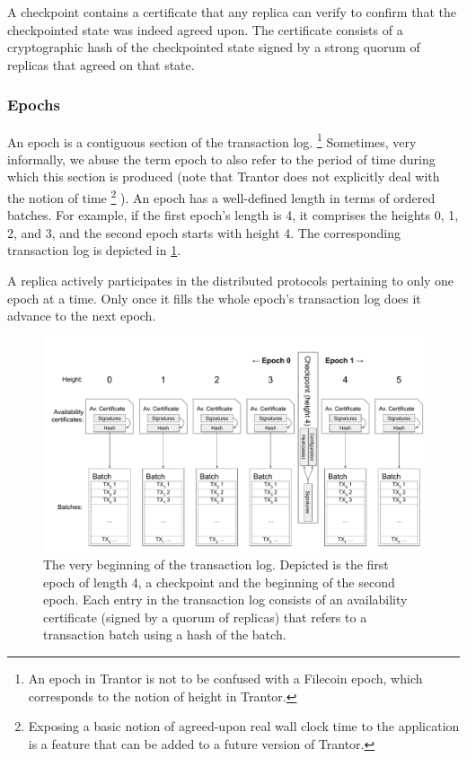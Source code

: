 \documentclass{article}
\begin{document}
A checkpoint contains a certificate that any replica can verify
to confirm that the checkpointed state was indeed agreed upon.
The certificate consists of a cryptographic hash of the checkpointed state
signed by a strong quorum of replicas that agreed on that state.

\subsubsection{Epochs}

An epoch is a contiguous section of the transaction log.%
\footnote{An epoch in Trantor is not to be confused with a Filecoin epoch,
which corresponds to the notion of height in Trantor.}
Sometimes, very informally, we abuse the term epoch to also refer to the period of time
during which this section is produced (note that Trantor does not explicitly deal with the notion of time%
\footnote{Exposing a basic notion of agreed-upon real wall clock time to the application
is a feature that can be added to a future version of Trantor.}
).
An epoch has a well-defined length in terms of ordered batches.
For example, if the first epoch’s length is 4, it comprises the heights 0, 1, 2, and 3,
and the second epoch starts with height 4.
The corresponding transaction log is depicted in \cref{fig:transaction-log}.

A replica actively participates in the distributed protocols pertaining to only one epoch at a time.
Only once it fills the whole epoch’s transaction log does it advance to the next epoch.

\begin{figure}[h]
    \centering
    \includegraphics[width=\textwidth]{figures/transaction-log}
    \caption{The very beginning of the transaction log.
    Depicted is the first epoch of length 4, a checkpoint and the beginning of the second epoch.
    Each entry in the transaction log consists of an availability certificate (signed by a quorum of replicas)
    that refers to a transaction batch using a hash of the batch.}
    \label{fig:transaction-log}
\end{figure}
\end{document}
